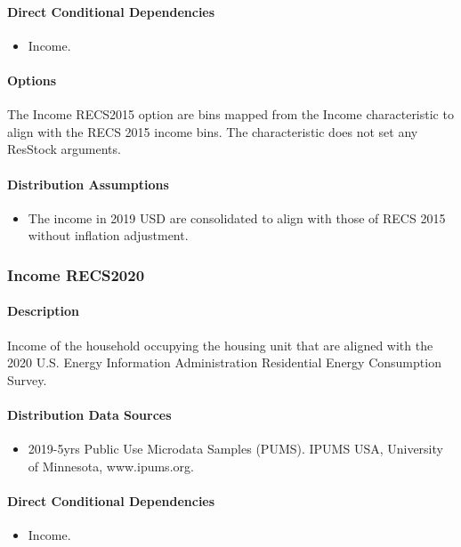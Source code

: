 \paragraph{Direct Conditional Dependencies}
\begin{itemize}
    \item Income.
\end{itemize}

\paragraph{Options}
The Income RECS2015 option are bins mapped from the Income characteristic to align with the RECS 2015 income bins. The characteristic does not set any ResStock arguments.

\paragraph{Distribution Assumptions}
\begin{itemize}
\item
  The income in 2019 USD are consolidated to align with those of RECS 2015 without inflation adjustment.
\end{itemize}

\subsubsection{Income RECS2020}\label{income_recs2020}
\paragraph{Description}
Income of the household occupying the housing unit that are aligned
with the 2020 U.S. Energy Information Administration Residential Energy
Consumption Survey.

\paragraph{Distribution Data Sources}
\begin{itemize} 
\item
  2019-5yrs Public Use Microdata Samples (PUMS). IPUMS USA, University
  of Minnesota, www.ipums.org.
\end{itemize}

\paragraph{Direct Conditional Dependencies}
\begin{itemize}
    \item Income.
\end{itemize}

